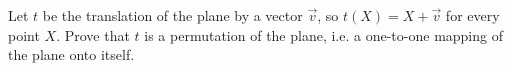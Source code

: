 Let $t$ be the translation of the plane by a vector $\vec v$, so $t(X)=X+\vec v$ for every point $X$. Prove that $t$ is a permutation of the plane, i.e. a one-to-one mapping of the plane onto itself.
